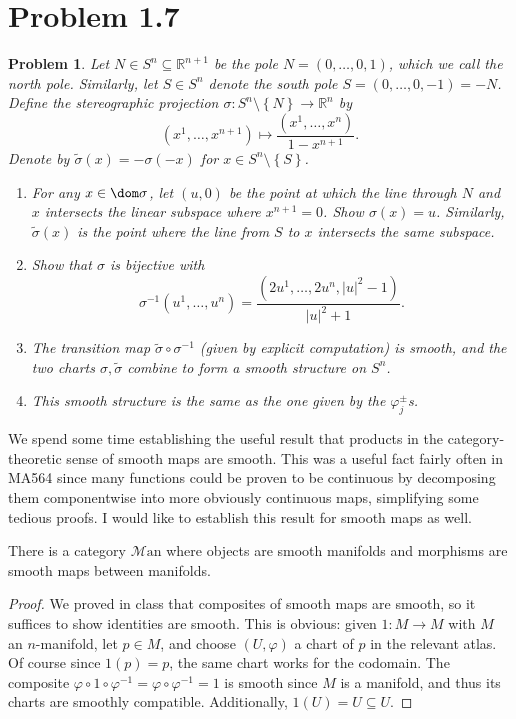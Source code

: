 \documentclass[11pt, letterpaper]{article}
\theoremstyle{theorem}
\newtheorem{problem}{Problem}
\begin{document}
\section{Problem 1.7}
\begin{problem}\label{3}
	Let $N\in S^n\subseteq \mathbb{R} ^{n+1} $ be the pole $N=(0, \ldots ,0,1)$, which we call the \emph{north pole}. Similarly, let $S\in S^n$ denote the \emph{south pole} $S=(0, \ldots ,0,-1)=-N$. Define the stereographic projection $\sigma : S^n\setminus \left\{ N \right\} \to \mathbb{R} ^n$ by
	\[
		(x^1, \ldots ,x^{n+1} ) \mapsto \frac{(x^1, \ldots ,x^n)}{1-x^{n+1} }
	.\]
	Denote by $\widetilde{\sigma } (x)=-\sigma (-x)$ for $x\in S^n\setminus \left\{ S \right\} $.
	\begin{enumerate}
		\item For any $x\in\dom \sigma $, let $(u,0)$ be the point at which the line through $N$ and $x$ intersects the linear subspace where $x^{n+1} =0$. Show $\sigma (x)=u$. Similarly, $\widetilde{\sigma } (x)$ is the point where the line from $S$ to $x$ intersects the same subspace.
		\item Show that $\sigma $ is bijective with
			\[
				\sigma ^{-1} (u^1, \ldots ,u^n) = \frac{(2u^1, \ldots ,2u^n, \left| u \right| ^2-1)}{\left| u \right| ^2+1} 
			.\]
		\item The transition map $\widetilde{\sigma } \circ \sigma ^{-1} $ (given by explicit computation) is smooth, and the two charts $\sigma ,\widetilde{\sigma } $ combine to form a smooth structure on $S^n$.
		\item This smooth structure is the same as the one given by the $\varphi _j^{\pm} $s.
	\end{enumerate}
\end{problem}
We spend some time establishing the useful result that products in the category-theoretic sense of smooth maps are smooth. This was a useful fact fairly often in MA564 since many functions could be proven to be continuous by decomposing them componentwise into more obviously continuous maps, simplifying some tedious proofs. I would like to establish this result for smooth maps as well.

\begin{lemma}\label{3.2}
	There is a category $\mathcal{M} \mathrm{an} $ where objects are smooth manifolds and morphisms are smooth maps between manifolds.
\end{lemma}
\begin{proof}
	We proved in class that composites of smooth maps are smooth, so it suffices to show identities are smooth. This is obvious: given $1: M \to M$ with $M$ an $n$-manifold, let $p\in M$, and choose $(U,\varphi )$ a chart of $p$ in the relevant atlas. Of course since $1(p)=p$, the same chart works for the codomain. The composite $\varphi \circ 1\circ \varphi ^{-1} =\varphi \circ \varphi ^{-1} =1$ is smooth since $M$ is a manifold, and thus its charts are smoothly compatible. Additionally, $1(U)=U\subseteq U$.
\end{proof}
\end{document}
